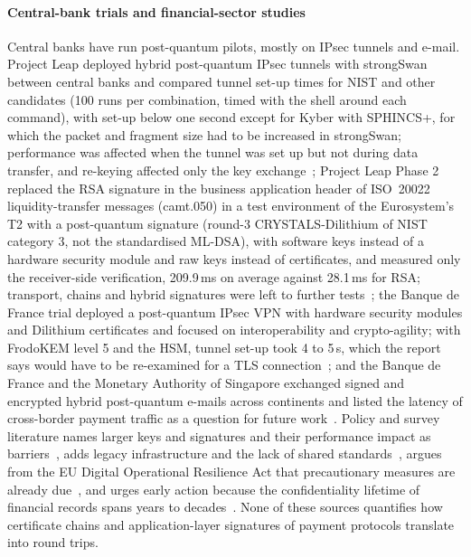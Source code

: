 \documentclass[preprint,12pt]{elsarticle}
\newcommand{\ms}{\,ms\xspace}
\begin{document}
\paragraph{Central-bank trials and financial-sector studies} Central banks have run post-quantum pilots, mostly on IPsec tunnels and e-mail. Project Leap deployed hybrid post-quantum IPsec tunnels with strongSwan between central banks and compared tunnel set-up times for NIST and other candidates (100 runs per combination, timed with the shell around each command), with set-up below one second except for Kyber with SPHINCS+, for which the packet and fragment size had to be increased in strongSwan; performance was affected when the tunnel was set up but not during data transfer, and re-keying affected only the key exchange~\cite{bis_leap2023}; Project Leap Phase 2 replaced the RSA signature in the business application header of ISO~20022 liquidity-transfer messages (camt.050) in a test environment of the Eurosystem's T2 with a post-quantum signature (round-3 CRYSTALS-Dilithium of NIST category 3, not the standardised ML-DSA), with software keys instead of a hardware security module and raw keys instead of certificates, and measured only the receiver-side verification, 209.9\ms on average against 28.1\ms for RSA; transport, chains and hybrid signatures were left to further tests~\cite{bis_leap2025}; the Banque de France trial deployed a post-quantum IPsec VPN with hardware security modules and Dilithium certificates and focused on interoperability and crypto-agility; with FrodoKEM level 5 and the HSM, tunnel set-up took 4 to 5\,s, which the report says would have to be re-examined for a TLS connection~\cite{bdf2022}; and the Banque de France and the Monetary Authority of Singapore exchanged signed and encrypted hybrid post-quantum e-mails across continents and listed the latency of cross-border payment traffic as a question for future work~\cite{bdfmas2024}. Policy and survey literature names larger keys and signatures and their performance impact as barriers~\cite{g7qtwg2026,baseri2026}, adds legacy infrastructure and the lack of shared standards~\cite{g7qtwg2026,andriani2024}, argues from the EU Digital Operational Resilience Act that precautionary measures are already due~\cite{janciute2025}, and urges early action because the confidentiality lifetime of financial records spans years to decades~\cite{baradziej2026,mosca2018}. None of these sources quantifies how certificate chains and application-layer signatures of payment protocols translate into round trips.
\end{document}
